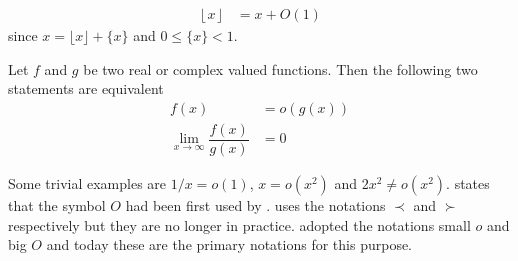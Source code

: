 \documentclass[elemannt.tex]{subfile}
\begin{document}
		\begin{align*}
			\left\lfloor{x}\right\rfloor
				& = x+O(1)
		\end{align*}
	since $x=\lfloor{x}\rfloor+\{x\}$ and $0\leq \{x\}<1$.
		\begin{definition}[Small O]
			Let $f$ and $g$ be two real or complex valued functions. Then the following two statements are equivalent
				\begin{align}
					f(x)
						& = o(g(x))\\
					\lim\limits_{x\to\infty}\dfrac{f(x)}{g(x)}
						& = 0
				\end{align}
		\end{definition}
	Some trivial examples are $1/x=o(1)$, $x=o(x^{2})$ and $2x^{2}\neq o(x^{2})$.  \textcite[Page 883 (second volume is paged consecutively after first volume)]{landau_1909} states that the symbol $O$ had been first used by \textcite[Page 401]{bachmann_1894}. \textcite{hardy_1910} uses the notations $\prec$ and $\succ$ respectively but they are no longer in practice. \textcite{hardy_riesz_1915} adopted the notations small $o$ and big $O$ and today these are the primary notations for this purpose.
	
\end{document}
